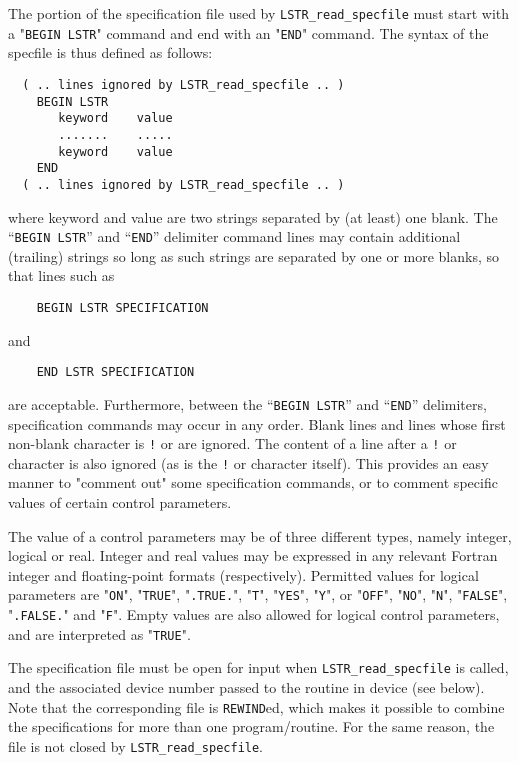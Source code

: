 \documentclass{galahad}
\newcommand{\packagename}{LS\-TR}
\begin{document}
The portion of the specification file used by 
{\tt \packagename\_read\_specfile}
must start
with a "{\tt BEGIN \packagename}" command and end with an 
"{\tt END}" command.  The syntax of the specfile is thus defined as follows:
\begin{verbatim}
  ( .. lines ignored by LSTR_read_specfile .. )
    BEGIN LSTR
       keyword    value
       .......    .....
       keyword    value
    END 
  ( .. lines ignored by LSTR_read_specfile .. )
\end{verbatim}
where keyword and value are two strings separated by (at least) one blank.
The ``{\tt BEGIN \packagename}'' and ``{\tt END}'' delimiter command lines 
may contain additional (trailing) strings so long as such strings are 
separated by one or more blanks, so that lines such as
\begin{verbatim}
    BEGIN LSTR SPECIFICATION
\end{verbatim}
and
\begin{verbatim}
    END LSTR SPECIFICATION
\end{verbatim}
are acceptable. Furthermore, 
between the
``{\tt BEGIN \packagename}'' and ``{\tt END}'' delimiters,
specification commands may occur in any order.  Blank lines and
lines whose first non-blank character is {\tt !} or {\tt *} are ignored. 
The content 
of a line after a {\tt !} or {\tt *} character is also 
ignored (as is the {\tt !} or {\tt *}
character itself). This provides an easy manner to "comment out" some 
specification commands, or to comment specific values 
of certain control parameters.  

The value of a control parameters may be of three different types, namely
integer, logical or real.
Integer and real values may be expressed in any relevant Fortran integer and
floating-point formats (respectively). Permitted values for logical
parameters are "{\tt ON}", "{\tt TRUE}", "{\tt .TRUE.}", "{\tt T}", 
"{\tt YES}", "{\tt Y}", or "{\tt OFF}", "{\tt NO}",
"{\tt N}", "{\tt FALSE}", "{\tt .FALSE.}" and "{\tt F}". 
Empty values are also allowed for 
logical control parameters, and are interpreted as "{\tt TRUE}".  

The specification file must be open for 
input when {\tt \packagename\_read\_specfile}
is called, and the associated device number 
passed to the routine in device (see below). 
Note that the corresponding 
file is {\tt REWIND}ed, which makes it possible to combine the specifications 
for more than one program/routine.  For the same reason, the file is not
closed by {\tt \packagename\_read\_specfile}.
\end{document}
